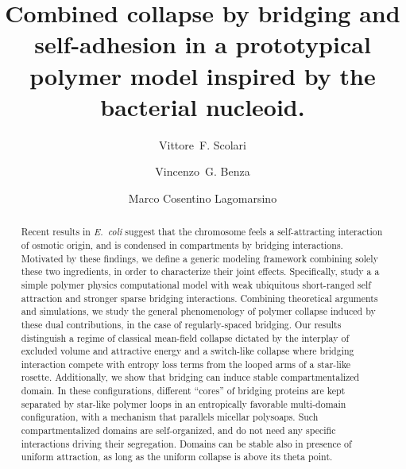 \documentclass[
preprint,
a4paper,
12pt,
superscriptaddress,
pre]{revtex4}
\begin{document}
 

\title{Combined collapse by bridging and self-adhesion in a
  prototypical polymer model inspired by the bacterial nucleoid.}

\author{Vittore~F. Scolari}
%
%
%
% 
%
\author{Vincenzo~G. Benza}
%
%
\author{Marco Cosentino Lagomarsino}
%

\begin{abstract}
  Recent results in \emph{E.~coli} suggest that the chromosome feels a
  self-attracting interaction of osmotic origin, and is condensed in
  compartments by bridging interactions.
  Motivated by these findings, we define a generic modeling framework
  combining solely these two ingredients, in order to characterize
  their joint effects. Specifically, study a a simple polymer physics
  computational model with weak ubiquitous short-ranged self
  attraction and stronger sparse bridging interactions.  Combining
  theoretical arguments and simulations, we study the general
  phenomenology of polymer collapse induced by these dual
  contributions, in the case of regularly-spaced bridging.
%
  Our results distinguish a regime of classical mean-field collapse
  dictated by the interplay of excluded volume and attractive energy
  and a switch-like collapse where bridging interaction compete with
  entropy loss terms from the looped arms of a star-like rosette.
%
  Additionally, we show that bridging can induce stable
  compartmentalized domain. In these configurations, different
  ``cores'' of bridging proteins are kept separated by star-like
  polymer loops in an entropically favorable multi-domain
  configuration, with a mechanism that parallels micellar polysoaps.
  Such compartmentalized domains are self-organized, and do not need
  any specific interactions driving their segregation.  Domains can be
  stable also in presence of uniform attraction, as long as the
  uniform collapse is above its theta point.
\end{abstract}
\end{document}
